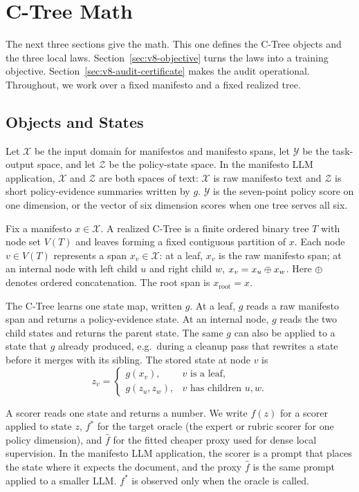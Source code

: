 \section{C-Tree Math}\label{sec:v8-ctree-math}

The next three sections give the math. This one defines the C-Tree
objects and the three local laws.
Section~\ref{sec:v8-objective} turns the laws into a training
objective. Section~\ref{sec:v8-audit-certificate} makes the audit
operational. Throughout, we work over a fixed manifesto and a fixed
realized tree.

\subsection{Objects and States}

Let \(\mathcal X\) be the input domain for manifestos and manifesto
spans, let \(\mathcal Y\) be the task-output space, and let
\(\mathcal Z\) be the policy-state space. In the manifesto LLM
application, \(\mathcal X\) and \(\mathcal Z\) are both spaces of text:
\(\mathcal X\) is raw manifesto text and \(\mathcal Z\) is short
policy-evidence summaries written by \(g\). \(\mathcal Y\) is the
seven-point policy score on one dimension, or the vector of six
dimension scores when one tree serves all six.

Fix a manifesto \(x\in\mathcal X\). A realized C-Tree is a finite
ordered binary tree \(T\) with node set \(V(T)\) and leaves forming a
fixed contiguous partition of \(x\). Each node \(v\in V(T)\) represents
a span \(x_v\in\mathcal X\): at a leaf, \(x_v\) is the raw manifesto
span; at an internal node with left child \(u\) and right child \(w\),
\(x_v=x_u\oplus x_w\). Here \(\oplus\) denotes ordered concatenation.
The root span is \(x_{\mathrm{root}}=x\).

The C-Tree learns one state map, written \(g\). At a leaf, \(g\) reads
a raw manifesto span and returns a policy-evidence state. At an
internal node, \(g\) reads the two child states and returns the parent
state. The same \(g\) can also be applied to a state that \(g\) already
produced, e.g.\ during a cleanup pass that rewrites a state before it
merges with its sibling. The stored state at node \(v\) is
\[
  z_v =
  \begin{cases}
    g(x_v), & v \text{ is a leaf},\\
    g(z_u,z_w), & v \text{ has children }u,w.
  \end{cases}
\]

A scorer reads one state and returns a number. We write \(f(z)\) for a
scorer applied to state \(z\), \(f^\ast\) for the target oracle (the
expert or rubric scorer for one policy dimension), and
\(\widehat f\) for the fitted cheaper proxy used for dense local
supervision. In the manifesto LLM application, the scorer is a prompt
that places the state where it expects the document, and the proxy
\(\widehat f\) is the same prompt applied to a smaller LLM. \(f^\ast\)
is observed only when the oracle is called.

